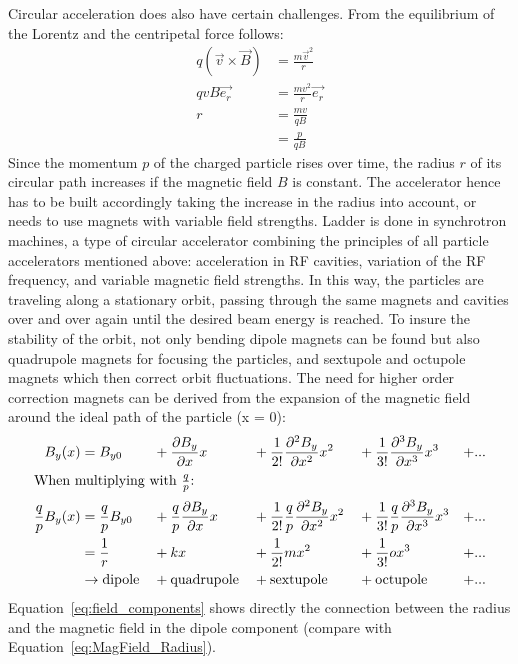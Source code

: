 Circular acceleration does also have certain challenges.
From the equilibrium of the Lorentz and the centripetal force follows:
\begin{align}
q(\vec{v}\times \vec{B}) &= \frac{m\vec{v}^2}{r}\\
qvB\vec{e_r} &= \frac{mv^2}{r}\vec{e_r} \nonumber \\
 r&=\frac{mv}{qB}\\
 &=\frac{p}{qB}\label{eq:MagField_Radius}
\end{align}
Since the momentum $p$ of the charged particle rises over time, the radius $r$ of its circular path increases if the magnetic field $B$ is constant.
The accelerator hence has to be built accordingly taking the increase in the radius into account, or needs to use magnets with variable field strengths.
Ladder is done in synchrotron machines, a type of circular accelerator combining the principles of all particle accelerators mentioned above: acceleration in RF cavities, variation of the RF frequency, and variable magnetic field strengths.
In this way, the particles are traveling along a stationary orbit, passing through the same magnets and cavities over and over again until the desired beam energy is reached.
To insure the stability of the orbit, not only bending dipole magnets can be found but also quadrupole magnets for focusing the particles, and sextupole and octupole magnets which then correct orbit fluctuations.
The need for higher order correction magnets can be derived from the expansion of the magnetic field around the ideal path of the particle (x = 0):
\begin{alignat}{5}
 B_y(x) &= B_{y0} &&+ \frac{\partial B_y}{\partial x}x &&+ \frac{1}{2!}\frac{\partial^2 B_y}{\partial x^2}x^2 &&+ \frac{1}{3!}\frac{\partial^3 B_y}{\partial x^3}x^3 &+ ...\\
 \intertext{When multiplying with $\frac{q}{p}$:}
 \frac{q}{p}B_y(x) &= \frac{q}{p}B_{y0} &&+ \frac{q}{p}\frac{\partial B_y}{\partial x}x &&+  \frac{1}{2!}\frac{q}{p}\frac{\partial^2 B_y}{\partial x^2}x^2 &&+ \frac{1}{3!}\frac{q}{p}\frac{\partial^3 B_y}{\partial x^3}x^3 &+ ...\\
  &= \frac{1}{r} &&+ kx &&+ \frac{1}{2!}mx^2 &&+ \frac{1}{3!}ox^3 &+ ... \label{eq:field_components}\\
  &\rightarrow \textnormal{dipole} &&+ \textnormal{quadrupole} &&+ \textnormal{sextupole} &&+ \textnormal{octupole} &+ ...\nonumber
\end{alignat}
Equation~\ref{eq:field_components} shows directly the connection between the radius and the magnetic field in the dipole component (compare with Equation~\ref{eq:MagField_Radius}).
